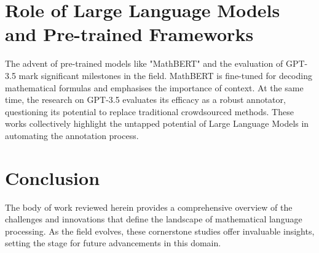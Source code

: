 \section{Role of Large Language Models and Pre-trained Frameworks}

The advent of pre-trained models like "MathBERT" \citep{peng2021mathbert} and the evaluation of GPT-3.5 \citep{he2023annollm} mark significant milestones in the field. MathBERT is fine-tuned for decoding mathematical formulas and emphasises the importance of context. At the same time, the research on GPT-3.5 evaluates its efficacy as a robust annotator, questioning its potential to replace traditional crowdsourced methods. These works collectively highlight the untapped potential of Large Language Models in automating the annotation process.

\section{Conclusion}

The body of work reviewed herein provides a comprehensive overview of the challenges and innovations that define the landscape of mathematical language processing. As the field evolves, these cornerstone studies offer invaluable insights, setting the stage for future advancements in this domain.